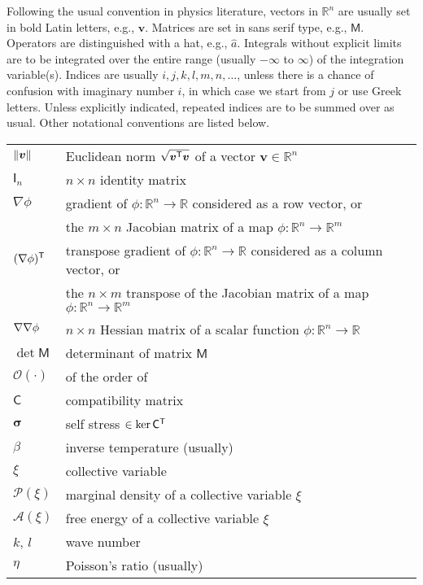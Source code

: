 
Following the usual convention in physics literature, vectors in $\mathbb{R}^{n}$ are usually set in bold Latin letters, e.g., $\bm{v}$.
Matrices are set in \textsf{sans serif} type, e.g., $\mathsf{M}$.
Operators are distinguished with a hat, e.g., $\hat{a}$.
Integrals without explicit limits are to be integrated over the entire range (usually $-\infty$ to $\infty$) of the integration variable(s).
Indices are usually $i, j, k, l, m, n, \ldots$, unless there is a chance of confusion with imaginary number $i$, in which case we start from $j$ or use Greek letters.
Unless explicitly indicated, repeated indices are to be summed over as usual.
Other notational conventions are listed below.\\

\begin{tabular}{ll}
  $\lVert\bm{v}\rVert$ & Euclidean norm $\sqrt{\bm{v}^\mathsf{T}\bm{v}}$ of a vector $\bm{v} \in \mathbb{R}^{n}$\\
  $\mathsf{I}_n$ & $n\times n$ identity matrix\\
  $\nabla \phi$ & gradient of $\phi: \mathbb{R}^n \to \mathbb{R}$ considered as a row vector, or\\
                & the $m\times n$ Jacobian matrix of a map $\phi: \mathbb{R}^n \to \mathbb{R}^m$\\
  $(\nabla\phi)^\mathsf{T}$ & transpose gradient of $\phi: \mathbb{R}^n \to \mathbb{R}$ considered as a column vector, or\\
                & the $n\times m$ transpose of the Jacobian matrix of a map $\phi: \mathbb{R}^n \to \mathbb{R}^m$\\
  $\nabla\nabla \phi$ & $n\times n$ Hessian matrix of a scalar function $\phi: \mathbb{R}^n \to \mathbb{R}$\\
  $\det\mathsf{M}$ & determinant of matrix $\mathsf{M}$\\
  $\mathcal{O}(\cdot)$ & of the order of\\
  $\mathsf{C}$ & compatibility matrix\\
  $\bm{\sigma}$ & self stress $\in \ker\mathsf{C}^\mathsf{T}$\\
  $\beta$ & inverse temperature (usually)\\
  $\xi$ & collective variable\\
  $\mathscr{P}(\xi)$ & marginal density of a collective variable $\xi$\\
  $\mathscr{A}(\xi)$ & free energy of a collective variable $\xi$\\
  $k$, $l$ & wave number\\
  $\eta$ & Poisson's ratio (usually)
\end{tabular}

